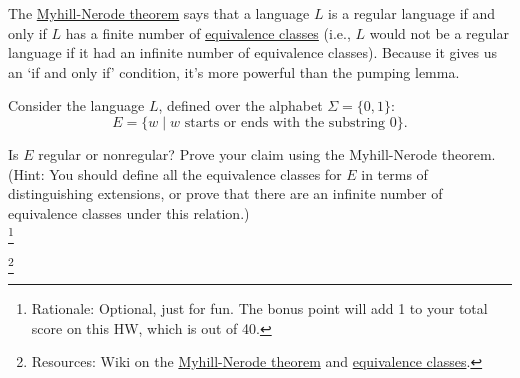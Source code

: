 \documentclass[letterpaper,11pt,twoside]{article}
\theoremstyle{plain}
\theoremstyle{definition}
\theoremstyle{remark}
\theoremstyle{restate}
\newcommand\blfootnote[1]{%
  \begingroup
  \renewcommand\thefootnote{}\footnote{#1}%
  \addtocounter{footnote}{-1}%
  \endgroup
}
\begin{document}
The \href{https://en.wikipedia.org/wiki/Myhill\%E2\%80\%93Nerode_theorem}{Myhill-Nerode theorem} says that a language $L$ is a regular language if and only if $L$ has a finite number of \href{https://en.wikipedia.org/wiki/Equivalence_class}{equivalence classes}  (i.e., $L$ would not be a regular language if it had an infinite number of equivalence classes). Because it gives us an `if and only if' condition, it's more powerful than the pumping lemma.
\newline

Consider the language $L$, defined over the alphabet $\Sigma=\{0, 1\}$:
\[
    E=\{w \; | \; w \text{ starts or ends with the substring } 0\}.
\]

Is $E$ regular or nonregular? Prove your claim using the Myhill-Nerode theorem. (Hint: You should define all the equivalence classes for $E$ in terms of distinguishing extensions, or prove that there are an infinite number of equivalence classes under this relation.)\\


\blfootnote{ Rationale: Optional, just for fun. The bonus point will add 1 to your total score on this HW, which is out of 40. }
\blfootnote{ Resources: Wiki on the \href{https://en.wikipedia.org/wiki/Myhill\%E2\%80\%93Nerode_theorem}{Myhill-Nerode theorem} and \href{https://en.wikipedia.org/wiki/Equivalence_class}{equivalence classes}. }
\end{document}

